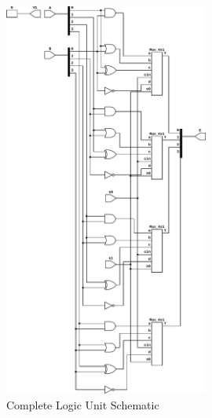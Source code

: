 \documentclass{article}
\begin{document}
\begin{figure}[p]
  \begin{center}
    \includegraphics[width=0.6\textwidth]{figures/LogicUnit.pdf}
  \end{center}
  \caption{Complete Logic Unit Schematic}
\end{figure}
\end{document}
